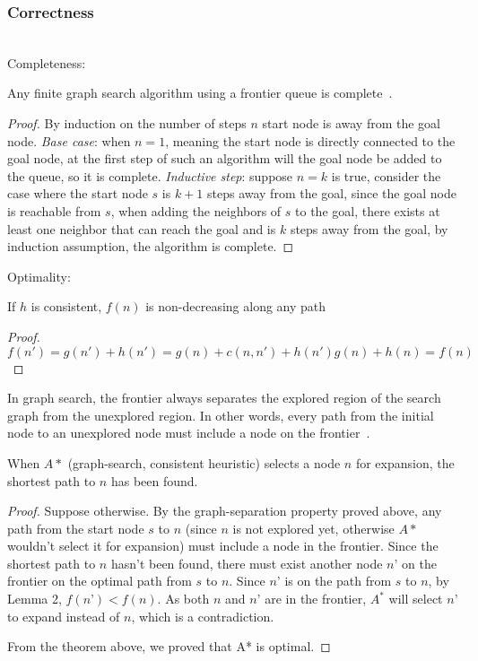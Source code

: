 \documentclass{llncs}
\begin{document}
\subsubsection{Correctness}\hfill\\
Completeness: 
\begin{lemma} 
Any finite graph search algorithm using a frontier queue is complete~\cite{ref_url1}.
\end{lemma} 
\begin{proof} 
By induction on the number of steps $n$ start node is away from the goal node. \emph{Base case}: when $n=1$, meaning the start node is directly connected to the goal node, at the first step of such an algorithm will the goal node be added to the queue, so it is complete. \emph{Inductive step}: suppose $n=k$ is true, consider the case where the start node $s$ is $k+1$ steps away from the goal, since the goal node is reachable from $s$, when adding the neighbors of $s$ to the goal, there exists at least one neighbor that can reach the goal and is $k$ steps away from the goal, by induction assumption, the algorithm is complete. 
\end{proof}
Optimality: 
\begin{lemma} 
If $h$ is consistent, $f(n)$ is non-decreasing along any path 
\end{lemma}
\begin{proof}
$f(n')=g(n')+h(n')=g(n)+c(n,n')+h(n')g(n)+h(n)=f(n)$ 
\end{proof}
\begin{lemma}  In graph search, the frontier always separates the explored region of the search graph from the unexplored region. In other words, every path from the initial node to an unexplored node must include a node on the frontier~\cite{ref_lncs1}. 
\end{lemma}
\begin{theorem} 
When $A*$ (graph-search, consistent heuristic) selects a node $n$ for expansion, the shortest path to $n$ has been found. 
\end{theorem}
\begin{proof}
Suppose otherwise. By the graph-separation property proved above, any path from the start node $s$ to $n$ (since $n$ is not explored yet, otherwise $A*$ wouldn't select it for expansion) must include a node in the frontier. Since the shortest path to $n$ hasn’t been found, there must exist another node $n’$ on the frontier on the optimal path from $s$ to $n$. Since $n’$ is on the path from $s$ to $n$, by Lemma 2, $f(n’)<f(n)$. As both $n$ and $n’$ are in the frontier, $A^*$ will select $n’$ to expand instead of $n$, which is a contradiction.

From the theorem above, we proved that A* is optimal.
\end{proof}
\end{document}
